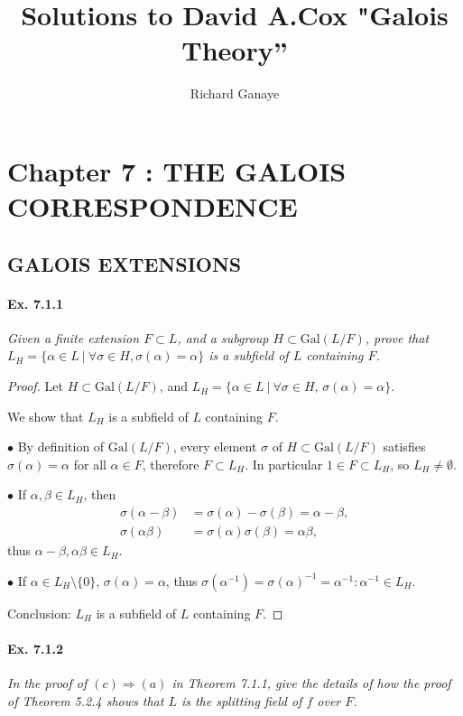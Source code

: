 \documentclass[11pt,a4paper]{article}
\title{Solutions to David A.Cox  "Galois Theory''}
\author{Richard Ganaye}
\newcommand{\Gal}{\mathrm{Gal}}
\begin{document}
\section{Chapter 7 : THE GALOIS CORRESPONDENCE}

\subsection{GALOIS EXTENSIONS}

\paragraph{Ex. 7.1.1}

{\it Given a finite extension $F \subset L$, and a subgroup $H \subset \Gal(L/F)$, prove that  $L_H = \{\alpha \in L \ | \ \forall \sigma \in H, \sigma(\alpha) = \alpha\}$ is a subfield of $L$ containing $F$.
}

\begin{proof}
Let $H \subset \Gal(L/F)$, and $L_H =\{\alpha \in L \ \vert \ \forall \sigma \in H,\, \sigma(\alpha) = \alpha\}$.

We show that $L_H$ is a subfield of $L$ containing $F$.

$\bullet$  By definition of $\Gal(L/F)$, every element $\sigma$ of $H\subset \Gal(L/F)$ satisfies $\sigma(\alpha) = \alpha$ for all $\alpha \in F$, therefore $F \subset L_H$. In particular $1 \in F \subset L_H $, so  $L_H \neq \emptyset$.

$\bullet$ If $\alpha, \beta \in L_H$, then 
\begin{align*}
\sigma(\alpha - \beta) &= \sigma(\alpha)- \sigma(\beta) = \alpha- \beta,\\
\sigma(\alpha \beta) &= \sigma(\alpha) \sigma(\beta) = \alpha \beta,
\end{align*}
thus $\alpha-\beta, \alpha \beta \in L_H$.

$\bullet$ If $\alpha \in L_H\setminus\{0\}$, $\sigma(\alpha) = \alpha$, thus $\sigma(\alpha^{-1}) = \sigma(\alpha)^{-1} = \alpha^{-1}: \alpha^{-1} \in L_H$.

Conclusion: $L_H$ is a subfield of $L$ containing $F$.
\end{proof}

\paragraph{Ex. 7.1.2}

{\it In the proof of $(c) \Rightarrow (a)$ in Theorem 7.1.1, give the details of how the proof of Theorem 5.2.4 shows that $L$ is the splitting field of $f$ over $F$.
}
\end{document}
